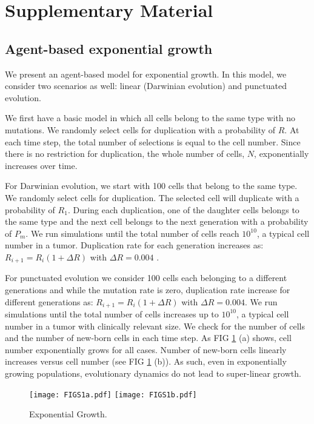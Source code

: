 \documentclass[aps,prl, superscriptaddress,groupedaddress]{revtex4}  %
\begin{document}
 	
 	
 		\section{ Supplementary Material}
 	 
 	
 	\subsection{ Agent-based exponential growth}
 	We present an agent-based model for exponential growth. In this model, we consider two scenarios as well: linear (Darwinian evolution) and punctuated evolution.
 	
 	We first have a basic model in which all cells belong to the same type with no mutations. We randomly select cells for duplication with a probability of $R$. At each time step, the total number of selections is equal to the cell number. Since there is no restriction for duplication, the whole number of cells, $N$, exponentially increases over time.   
 	
 	For Darwinian evolution, we start with 100 cells that belong to the same type. We randomly select cells for duplication. The selected cell will duplicate with a probability of $R_1$.  During each duplication, one of the daughter cells belongs to the same type and the next cell belongs to the next generation with a probability of $P_m$. We run simulations until the total number of cells reach $10^{10}$, a typical cell number in a tumor. Duplication rate for each generation increases as: $R_{i+1}=R_i (1+ \Delta R)$ with $\Delta R=0.004$ \cite{bozic2010accumulation}.
 	
 	For punctuated evolution we consider 100 cells each belonging to a different generations and while the mutation rate is zero, duplication rate increase for different generations as: $R_{i+1}=R_i (1+ \Delta R)$ with $\Delta R=0.004$. We run simulations until the total number of cells increases up to $10^{10}$, a typical cell number in a tumor with clinically relevant size.  We check for the number of cells and the number of new-born cells in each time step. As FIG \ref{FIGS1} (a) shows, cell number exponentially grows for all cases. Number of new-born cells linearly increases versus cell number (see FIG  \ref{FIGS1} (b)). As such, even in exponentially growing populations, evolutionary dynamics do not lead to super-linear growth.       
 	
 	\begin{figure} [h]
 		\centering
 		\texttt{[image: FIGS1a.pdf]} 
 		\texttt{[image: FIGS1b.pdf]}   
 		\caption{Exponential Growth.}
 		\label{FIGS1}
 	\end{figure}
 	
\end{document}
